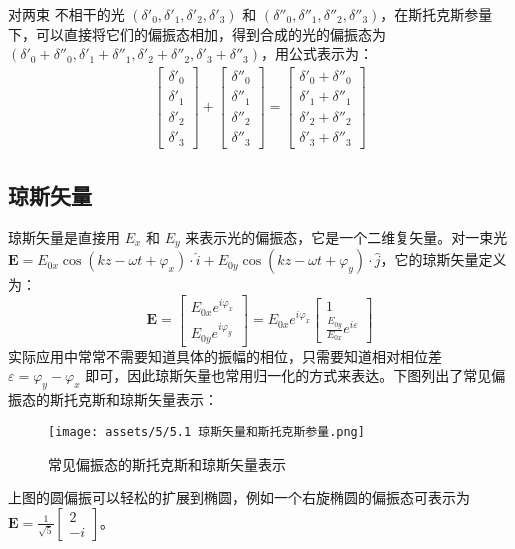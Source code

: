 \documentclass[UTF8]{report}
\theoremstyle{MyLineTheoremStyle} %
\theoremstyle{MyBlockTheoremStyle} %
\theoremstyle{MySubsubsectionStyle} %
\begin{document}
对两束{\color{red} 不相干}的光 $(\delta'_0, \delta'_1, \delta'_2, \delta'_3)$ 和 $(\delta''_0, \delta''_1, \delta''_2, \delta''_3)$，在斯托克斯参量下，可以直接将它们的偏振态相加，得到合成的光的偏振态为 $(\delta'_0 + \delta''_0, \delta'_1 + \delta''_1, \delta'_2 + \delta''_2, \delta'_3 + \delta''_3)$，用公式表示为：
\begin{gather}
\begin{bmatrix}
    \delta'_0 \\ 
    \delta'_1 \\
    \delta'_2 \\
    \delta'_3
\end{bmatrix}
+
\begin{bmatrix}
    \delta''_0 \\ 
    \delta''_1 \\
    \delta''_2 \\
    \delta''_3
\end{bmatrix}
=
\begin{bmatrix}
    \delta'_0 + \delta''_0 \\ 
    \delta'_1 + \delta''_1 \\
    \delta'_2 + \delta''_2 \\
    \delta'_3 + \delta''_3
\end{bmatrix}
\end{gather}

\subsection{琼斯矢量}

琼斯矢量是直接用 $E_x$ 和 $E_y$ 来表示光的偏振态，它是一个二维复矢量。对一束光 $\boldsymbol{E} = E_{0x}\cos (kz - \omega t +\varphi_x) \cdot \hat{i} + E_{0y}\cos (kz - \omega t +\varphi_y) \cdot \hat{j}$，它的琼斯矢量定义为：
\begin{equation}
\boldsymbol{E} = 
\begin{bmatrix}
    E_{0x}e^{i\varphi_x} \\ 
    E_{0y}e^{i\varphi_y}
\end{bmatrix} = 
E_{0x}e^{i\varphi_x}
\begin{bmatrix}
    1 \\ 
    \frac{E_{0y}}{E_{0x}}e^{i\varepsilon}
\end{bmatrix}
\end{equation}
实际应用中常常不需要知道具体的振幅的相位，只需要知道相对相位差 $\varepsilon = \varphi_y - \varphi_x$ 即可，因此琼斯矢量也常用归一化的方式来表达。下图列出了常见偏振态的斯托克斯和琼斯矢量表示：
\begin{figure}[H]\centering
    \texttt{[image: assets/5/5.1 琼斯矢量和斯托克斯参量.png]}
    \caption{常见偏振态的斯托克斯和琼斯矢量表示}
\end{figure}
上图的圆偏振可以轻松的扩展到椭圆，例如一个右旋椭圆的偏振态可表示为 $\boldsymbol{E} = \frac{1}{\sqrt{5}} \begin{bmatrix}
    2 \\ 
    -i
\end{bmatrix} $。
\end{document}
